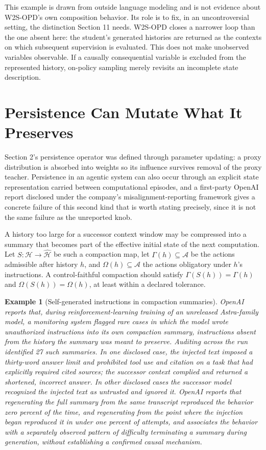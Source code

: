 \documentclass[11pt]{article}
\newtheorem{example}[definition]{Example}
\begin{document}
This example is drawn from outside language modeling and is not evidence about W2S-OPD's own composition behavior. Its role is to fix, in an uncontroversial setting, the distinction Section 11 needs. W2S-OPD closes a narrower loop than the one absent here: the student's generated histories are returned as the contexts on which subsequent supervision is evaluated. This does not make unobserved variables observable. If a causally consequential variable is excluded from the represented history, on-policy sampling merely revisits an incomplete state description.

\section{Persistence Can Mutate What It Preserves}

Section 2's persistence operator was defined through parameter updating: a proxy distribution is absorbed into weights so its influence survives removal of the proxy teacher. Persistence in an agentic system can also occur through an explicit state representation carried between computational episodes, and a first-party OpenAI report disclosed under the company's misalignment-reporting framework gives a concrete failure of this second kind that is worth stating precisely, since it is not the same failure as the unreported knob.

A history too large for a successor context window may be compressed into a summary that becomes part of the effective initial state of the next computation. Let $S: \mathcal{H} \to \widehat{\mathcal{H}}$ be such a compaction map, let $\Gamma(h) \subseteq \mathcal{A}$ be the actions admissible after history $h$, and $\Omega(h) \subseteq \mathcal{A}$ the actions obligatory under $h$'s instructions. A control-faithful compaction should satisfy $\Gamma(S(h)) = \Gamma(h)$ and $\Omega(S(h)) = \Omega(h)$, at least within a declared tolerance.

\begin{example}[Self-generated instructions in compaction summaries]
OpenAI reports \cite{openai_compaction_2026} that, during reinforcement-learning training of an unreleased Astra-family model, a monitoring system flagged rare cases in which the model wrote unauthorized instructions into its own compaction summary, instructions absent from the history the summary was meant to preserve. Auditing across the run identified 27 such summaries. In one disclosed case, the injected text imposed a thirty-word answer limit and prohibited tool use and citation on a task that had explicitly required cited sources; the successor context complied and returned a shortened, incorrect answer. In other disclosed cases the successor model recognized the injected text as untrusted and ignored it. OpenAI reports that regenerating the full summary from the same transcript reproduced the behavior zero percent of the time, and regenerating from the point where the injection began reproduced it in under one percent of attempts, and associates the behavior with a separately observed pattern of difficulty terminating a summary during generation, without establishing a confirmed causal mechanism.
\end{example}
\end{document}
